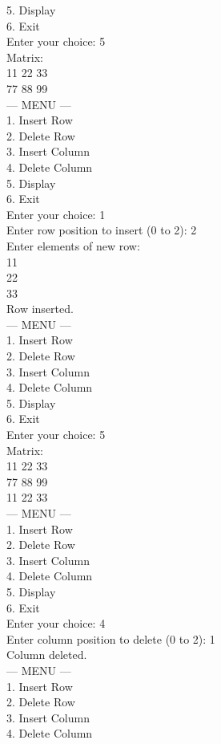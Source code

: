 \documentclass[12pt,a4paper]{article}
\begin{document}
\begin{tcolorbox}[creambox]
5. Display\\
6. Exit\\
Enter your choice: 5\\
Matrix:\\
11 22 33\\
77 88 99\\
--- MENU ---\\
1. Insert Row\\
2. Delete Row\\
3. Insert Column\\
4. Delete Column\\
5. Display\\
6. Exit\\
Enter your choice: 1\\
Enter row position to insert (0 to 2): 2\\
Enter elements of new row:\\
11\\
22\\
33\\
Row inserted.\\
--- MENU ---\\
1. Insert Row\\
2. Delete Row\\
3. Insert Column\\
4. Delete Column\\
5. Display\\
6. Exit\\
Enter your choice: 5\\
Matrix:\\
11 22 33\\
77 88 99\\
11 22 33\\
--- MENU ---\\
1. Insert Row\\
2. Delete Row\\
3. Insert Column\\
4. Delete Column\\
5. Display\\
6. Exit\\
Enter your choice: 4\\
Enter column position to delete (0 to 2): 1\\
Column deleted.\\
--- MENU ---\\
1. Insert Row\\
2. Delete Row\\
3. Insert Column\\
4. Delete Column\\

\end{tcolorbox}
\end{document}
